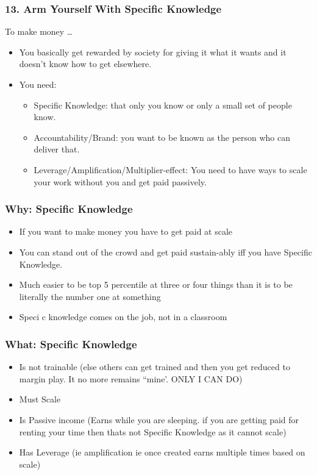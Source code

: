 \begin{frame}[fragile]
\frametitle{13. Arm Yourself With Specific Knowledge}
To make money \ldots
\begin{itemize}
\item You basically get rewarded by society for giving it what it wants and it doesn't know how to get elsewhere.
\item You need:
\begin{itemize}
\item Specific Knowledge: that only you know or only a small set of people know.
\item Accountability/Brand: you want to be known as the person who can deliver that.
\item Leverage/Amplification/Multiplier-effect: You need to have ways to scale your work without you and get paid passively.
\end{itemize}
\end{itemize}
\end{frame}

\begin{frame}[fragile]
\frametitle{Why: Specific Knowledge}
\begin{itemize}
\item If you want to make money you have to get paid at scale
\item You can stand out of the crowd and get paid sustain-ably iff you have Specific Knowledge.
\item  Much easier to be top 5 percentile at three or four things than it is to be literally the number one at something
\item Speci c knowledge comes on the job, not in a classroom
\end{itemize}
\end{frame}

\begin{frame}[fragile]
\frametitle{What: Specific Knowledge}
\begin{itemize}
\item Is not trainable (else others can get trained and then you get reduced to margin play. It no more remains ``mine'. ONLY I CAN DO)
\item Must Scale
\item Is Passive income (Earns while you are sleeping. if you are getting paid for renting your time then thats not Specific Knowledge as it cannot scale)
\item Has Leverage (ie amplification ie once created earns multiple times based on scale)
\end{itemize}
\end{frame}


